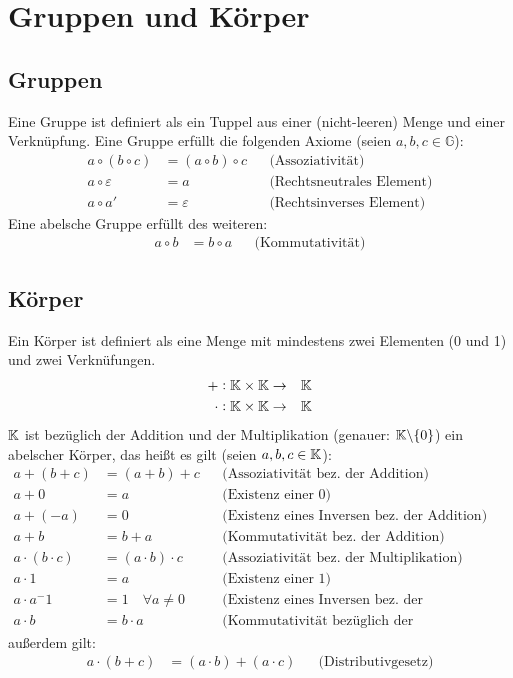\section{Gruppen und Körper}
\subsection{Gruppen}
Eine Gruppe ist definiert als ein Tuppel aus einer (nicht-leeren) Menge
und einer Verknüpfung.
Eine Gruppe erfüllt die folgenden Axiome (seien $a,b,c \in \mathbb{G}$):
\begin{align*}
    a \circ (b \circ c) &= (a \circ b) \circ c &&\text{(Assoziativität)}\\
    a \circ \varepsilon &= a &&\text{(Rechtsneutrales Element)}\\
    a \circ a' &= \varepsilon  &&\text{(Rechtsinverses Element)}
\end{align*}
Eine abelsche Gruppe erfüllt des weiteren:
\begin{align*}
    a \circ b &= b \circ a  &&\text{(Kommutativität)}
\end{align*}

\subsection{Körper}
Ein Körper ist definiert als eine Menge mit mindestens zwei Elementen
(0 und 1) und zwei Verknüfungen.
\begin{eqnarray*}
    +: \mathbb{K} \times \mathbb{K} &\rightarrow& \mathbb{K} \\
    \cdot: \mathbb{K} \times \mathbb{K} &\rightarrow& \mathbb{K}
\end{eqnarray*}
$\mathbb{K}$ ist bezüglich der Addition und der Multiplikation (genauer: $\mathbb{K} \backslash \{0\}$) ein abelscher
Körper, das heißt es gilt (seien $a,b,c \in \mathbb{K}$):
\begin{align*}
    a + (b + c) &= (a + b) + c &&\text{(Assoziativität bez.\ der Addition)}\\
    a + 0 &= a &&\text{(Existenz einer 0)}\\
    a + (-a) &= 0 &&\text{(Existenz eines Inversen bez.\ der Addition)}\\
    a + b &= b + a &&\text{(Kommutativität bez.\ der Addition)}\\
    a \cdot (b \cdot c) &= (a \cdot b) \cdot c &&\text{(Assoziativität bez.\ der Multiplikation)}\\
    a \cdot 1 &= a &&\text{(Existenz einer 1)}\\
    a \cdot a^-1 &= 1\quad \forall a \neq 0 &&\text{(Existenz eines Inversen bez.\ der Multiplikation)}\\
    a \cdot b &= b \cdot a &&\text{(Kommutativität bezüglich der Multiplikation)}
\end{align*}
außerdem gilt:
\begin{align*}
    a \cdot (b + c) &= (a \cdot b) + (a \cdot c) &&\text{(Distributivgesetz)}
\end{align*}
